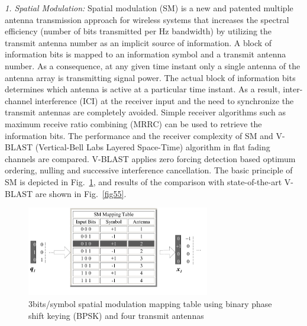 \emph{1. Spatial Modulation:}
Spatial modulation (SM) is a new and patented multiple antenna
transmission approach for wireless systems that increases the spectral
efficiency (number of bits transmitted per Hz bandwidth) by utilizing
the transmit antenna number as an implicit source of information. A
block of information bits is mapped to an information symbol and a
transmit antenna number. As a consequence, at any given time instant
only a single antenna of the antenna array is transmitting signal
power. The actual block of information bits determines which antenna
is active at a particular time instant. As a result, inter-channel
interference (ICI) at the receiver input and the need to synchronize
the transmit antennas are completely avoided. Simple receiver
algorithms such as maximum receive ratio combining (MRRC) can be used
to retrieve the information bits. The performance and the receiver
complexity of SM and V-BLAST (Vertical-Bell Labs Layered Space-Time)
algorithm in flat fading channels are compared. V-BLAST applies zero
forcing detection based optimum ordering, nulling and successive
interference cancellation. The basic principle of SM is depicted in Fig.~\ref{smexmpl}, and results of the comparison with state-of-the-art V-BLAST are shown in Fig.~\ref{fig55}.
\begin{figure}[!htb]\centering
  \centerline{\includegraphics[width=8cm]{haas_1.pdf}}
  \caption{3bits/symbol spatial modulation mapping table using binary phase shift keying (BPSK)
    and four transmit antennas} \label{smexmpl}
\end{figure}
